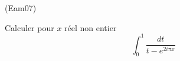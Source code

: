 \begin{tiny}(Eam07)\end{tiny}
Calculer pour $x$ réel non entier
\begin{displaymath}
 \int_{0}^{1}\dfrac{dt}{t-e^{2i\pi x}}
\end{displaymath}
